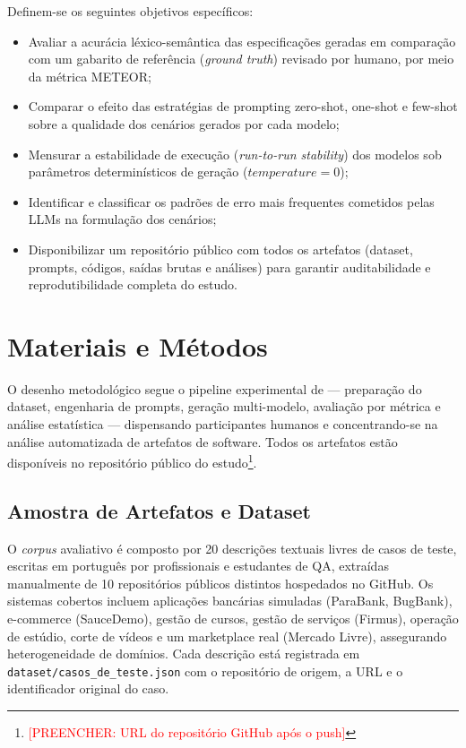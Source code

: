 \documentclass[12pt]{article}
\newcommand{\preencher}[1]{\textcolor{red}{[PREENCHER: #1]}}
\begin{document}
Definem-se os seguintes objetivos específicos:
\begin{itemize}
    \item Avaliar a acurácia léxico-semântica das especificações geradas em comparação com um gabarito de referência (\textit{ground truth}) revisado por humano, por meio da métrica METEOR;
    \item Comparar o efeito das estratégias de prompting zero-shot, one-shot e few-shot sobre a qualidade dos cenários gerados por cada modelo;
    \item Mensurar a estabilidade de execução (\textit{run-to-run stability}) dos modelos sob parâmetros determinísticos de geração ($temperature=0$);
    \item Identificar e classificar os padrões de erro mais frequentes cometidos pelas LLMs na formulação dos cenários;
    \item Disponibilizar um repositório público com todos os artefatos (dataset, prompts, códigos, saídas brutas e análises) para garantir auditabilidade e reprodutibilidade completa do estudo.
\end{itemize}

\section{Materiais e Métodos}

O desenho metodológico segue o pipeline experimental de \cite{fernandes2025} --- preparação do dataset, engenharia de prompts, geração multi-modelo, avaliação por métrica e análise estatística --- dispensando participantes humanos e concentrando-se na análise automatizada de artefatos de software. Todos os artefatos estão disponíveis no repositório público do estudo\footnote{\preencher{URL do repositório GitHub após o push}}.

\subsection{Amostra de Artefatos e Dataset}

O \textit{corpus} avaliativo é composto por 20 descrições textuais livres de casos de teste, escritas em português por profissionais e estudantes de QA, extraídas manualmente de 10 repositórios públicos distintos hospedados no GitHub. Os sistemas cobertos incluem aplicações bancárias simuladas (ParaBank, BugBank), e-commerce (SauceDemo), gestão de cursos, gestão de serviços (Firmus), operação de estúdio, corte de vídeos e um marketplace real (Mercado Livre), assegurando heterogeneidade de domínios. Cada descrição está registrada em \texttt{dataset/casos\_de\_teste.json} com o repositório de origem, a URL e o identificador original do caso.
\end{document}
